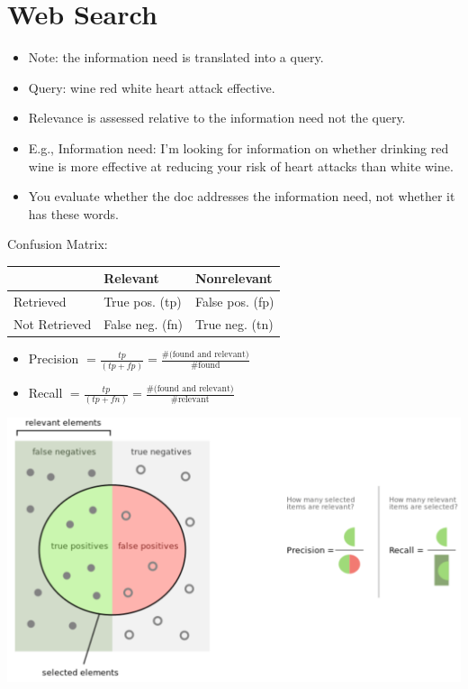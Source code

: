 
\section{Web Search}

\begin{breakbox}
\begin{itemize}
	\item Note: the information need is translated into a query.
	\item Query: wine red white heart attack effective.
	\item Relevance is assessed relative to the information need not the query.
	\item E.g., Information need: I'm looking for information on whether drinking red wine is more effective at reducing your risk of heart attacks than white wine.
	\item You evaluate whether the doc addresses the information need, not whether it has these words.
\end{itemize}
\end{breakbox}

\begin{breakbox}
\newline Confusion Matrix:
\begin{center}
\begin{tabular}{| l | l | l |}
\hline
 & Relevant & Nonrelevant \\ \hline
Retrieved	& True pos. (tp) & False pos. (fp) \\ \hline
Not Retrieved & False neg. (fn) & True neg. (tn) \\
\hline
\end{tabular}
\end{center}
\begin{itemize}
	\item Precision $= \frac{tp}{(tp + fp)} = \frac{\text{\# (found and relevant)}}{\text{\# found}}$
	\item Recall $= \frac{tp}{(tp + fn)} = \frac{\text{\# (found and relevant)}}{\text{\# relevant}}$
\end{itemize}
\begin{center}
\includegraphics[width=.15\textwidth]{slides_images/precision_recall}
\end{center}
\end{breakbox}

